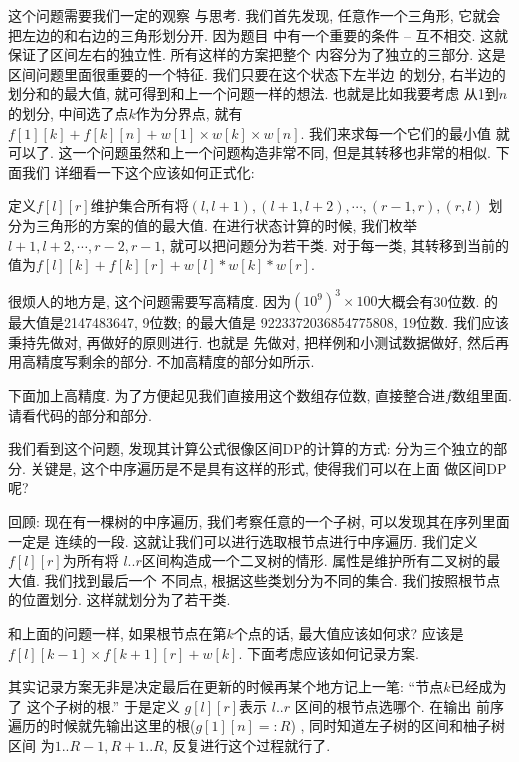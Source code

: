  这个问题需要我们一定的观察
与思考. 我们首先发现, 任意作一个三角形, 它就会把左边的和右边的三角形划分开. 因为题目
中有一个重要的条件 -- 互不相交. 这就保证了区间左右的独立性. 所有这样的方案把整个
内容分为了独立的三部分. 这是区间问题里面很重要的一个特征. 我们只要在这个状态下左半边
的划分, 右半边的划分和的最大值, 就可得到和上一个问题一样的想法. 也就是比如我要考虑
从1到$n$的划分, 中间选了点$k$作为分界点, 就有
$f[1][k]+f[k][n]+w[1]\times w[k] \times w[n]$. 我们来求每一个它们的最小值
就可以了. 这一个问题虽然和上一个问题构造非常不同, 但是其转移也非常的相似. 下面我们
详细看一下这个应该如何正式化: 

定义$f[l][r]$维护集合所有将$(l,l+1), (l+1, l+2), \cdots , (r-1, r), (r,l)$
划分为三角形的方案的值的最大值. 在进行状态计算的时候, 我们枚举$l+1, l+2,\cdots, r-2,
r-1$, 就可以把问题分为若干类. 对于每一类, 其转移到当前的值为$f[l][k]+f[k][r]+w[l]*w[k]*w[r]$.

很烦人的地方是, 这个问题需要写高精度. 因为$(10^9)^3\times100$大概会有30位数. 
的最大值是2147483647, 9位数; 的最大值是 
9223372036854775808, 19位数.  
我们应该秉持先做对, 再做好的原则进行. 也就是
先做对, 把样例和小测试数据做好, 然后再用高精度写剩余的部分. 
不加高精度的部分如所示. 

下面加上高精度. 为了方便起见我们直接用这个数组存位数, 直接整合进$f$数组里面. 
请看代码的部分和部分. 

 我们看到这个问题, 发现其计算公式很像区间DP的计算的方式: 
分为三个独立的部分. 关键是, 这个中序遍历是不是具有这样的形式, 使得我们可以在上面
做区间DP呢? 

回顾: 现在有一棵树的中序遍历, 我们考察任意的一个子树, 可以发现其在序列里面一定是
连续的一段. 这就让我们可以进行选取根节点进行中序遍历. 我们定义$f[l][r]$为所有将
$l..r$区间构造成一个二叉树的情形. 属性是维护所有二叉树的最大值. 我们找到最后一个
不同点, 根据这些类划分为不同的集合. 我们按照根节点的位置划分. 这样就划分为了若干类.

和上面的问题一样, 如果根节点在第$k$个点的话, 最大值应该如何求? 应该是
$f[l][k-1]\times f[k+1][r]+w[k]$. 下面考虑应该如何记录方案. 

其实记录方案无非是决定最后在更新的时候再某个地方记上一笔: ``节点$k$已经成为了
这个子树的根.'' 于是定义 $g[l][r]$表示 $l..r$ 区间的根节点选哪个. 在输出
前序遍历的时候就先输出这里的根($g[1][n]=:R$)
, 同时知道左子树的区间和柚子树区间
为$1..R-1, R+1..R$, 反复进行这个过程就行了. 

